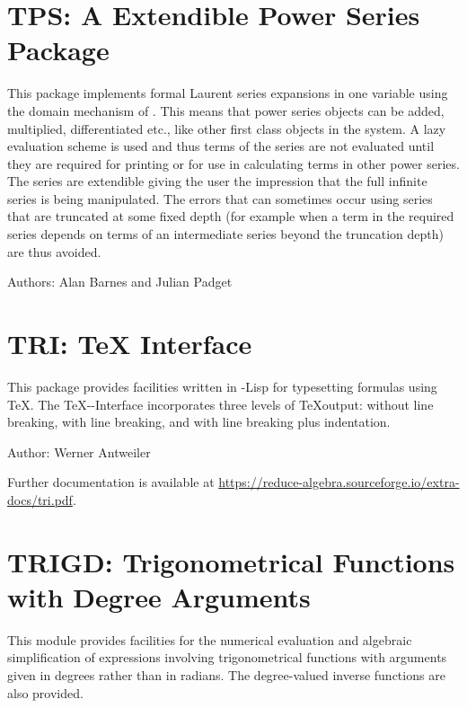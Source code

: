 \section{TPS: A Extendible Power Series Package}

This package implements formal Laurent series expansions in one variable
using the domain mechanism of \REDUCE.  This means that power series
objects can be added, multiplied, differentiated etc.,  like other first
class objects in the system.  A lazy evaluation scheme is used and thus
terms of the series are not evaluated until they are required for printing
or for use in calculating terms in other power series.  The series are
extendible giving the user the impression that the full infinite series is
being manipulated.  The errors that can sometimes occur using series that
are truncated at some fixed depth (for example when a term in the required
series depends on terms of an intermediate series beyond the truncation
depth) are thus avoided.

Authors: Alan Barnes and Julian Padget



\newpage
\fi

\section{TRI: TeX \REDUCE Interface}

This package provides facilities written in \REDUCE-Lisp for typesetting
\REDUCE formulas using \TeX.  The \TeX-\REDUCE-Interface incorporates three
levels of \TeX output: without line breaking, with line breaking, and
with line breaking plus indentation.

Author: Werner Antweiler

\begin{sloppypar}
  Further documentation is available at
  \url{https://reduce-algebra.sourceforge.io/extra-docs/tri.pdf}.
\end{sloppypar}

\newpage

\section{TRIGD: Trigonometrical Functions with Degree Arguments}

This module provides facilities for the numerical evaluation and
algebraic simplification of expressions involving trigonometrical
functions with arguments given in degrees rather than in radians. The
degree-valued inverse functions are also provided.

